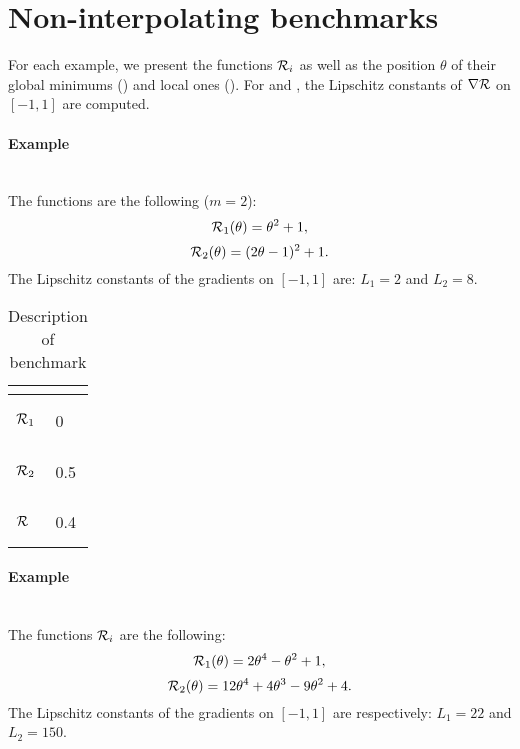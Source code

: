 \section{Non-interpolating benchmarks}
\label{annexe_non_interpolated}

For each example, we present the functions $\mathcal{R}_i$ as well as the position $\theta$ of their global minimums (\mg) and local ones (\ml). For \exOne and \exTwo, the Lipschitz constants of $\nabla \mathcal{R}$ on $[-1,1]$ are computed.

\paragraph{Example \exOne}
~~\\

The functions are the following ($m=2$):
\begin{equation*}
	\mathcal{R}_1(\theta) = \theta^2+1,
\end{equation*}
\begin{equation*}
	\mathcal{R}_2(\theta) = (2\theta-1)^2+1.
\end{equation*}
The Lipschitz constants of the gradients on $[-1,1]$ are: $L_1=2$ and $L_2=8$.

\begin{table}[h!]
	\centering
	\caption{Description of benchmark \exOne}
	\begin{tabular}{ll}
		
		\toprule
		\begin{bf} \diagbox{Functions}{Minimums} \end{bf} & \begin{bf}\mg\end{bf} \\ \midrule
		
		\begin{bf}$\mathcal{R}_1$\end{bf} &  0   \\ \midrule
		\begin{bf}$\mathcal{R}_2$\end{bf} &  0.5 \\ \midrule
		\begin{bf}$\mathcal{R}$\end{bf}   &  0.4 \\ \bottomrule
	\end{tabular}
	\label{ex1_example}
\end{table}

\paragraph{Example \exTwo}
~~\\
The functions $\mathcal{R}_i$ are the following:
\begin{equation*}
	\mathcal{R}_1(\theta) = 2\theta^4-\theta^2+1,
\end{equation*}
\begin{equation*}
	\mathcal{R}_2(\theta) = 12\theta^4+4\theta^3-9\theta^2+4.
\end{equation*}
The Lipschitz constants of the gradients on $[-1,1]$ are respectively: $L_1=22$ and $L_2=150$.

